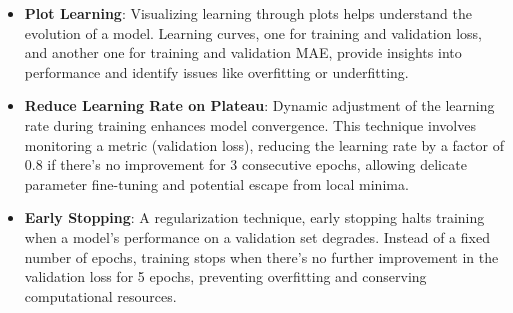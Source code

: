 \begin{itemize}
    \item \textbf{Plot Learning}: Visualizing learning through plots helps understand the evolution of a model. Learning curves, one for training and validation loss, and another one for training and validation MAE, provide insights into performance and identify issues like overfitting or underfitting.

    \item \textbf{Reduce Learning Rate on Plateau}: Dynamic adjustment of the learning rate during training enhances model convergence. This technique involves monitoring a metric (validation loss), reducing the learning rate by a factor of 0.8 if there's no improvement for 3 consecutive epochs, allowing delicate parameter fine-tuning and potential escape from local minima.

    \item \textbf{Early Stopping}: A regularization technique, early stopping halts training when a model's performance on a validation set degrades. Instead of a fixed number of epochs, training stops when there's no further improvement in the validation loss for 5 epochs, preventing overfitting and conserving computational resources.
\end{itemize}